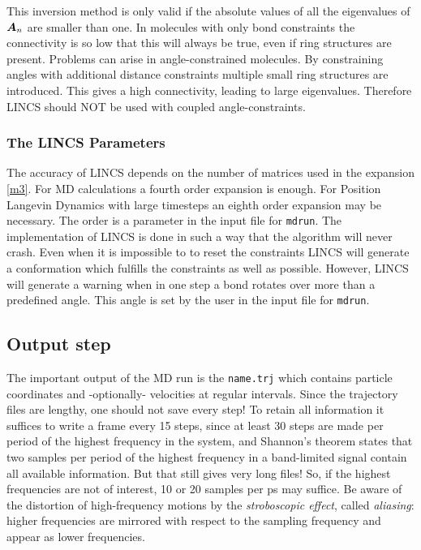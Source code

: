 This inversion method is only valid if the absolute values of all the
eigenvalues of $\mbox{\boldmath ${A}$}_n$ are smaller than one.
In molecules with only bond constraints the connectivity is so low
that this will always be true, even if ring structures are present.
Problems can arise in angle-constrained molecules.
By constraining angles with additional distance constraints
multiple small ring structures are introduced.
This gives a high connectivity, leading to large eigenvalues.
Therefore LINCS should NOT be used with coupled angle-constraints.

\subsubsection*{The LINCS Parameters}
The accuracy of LINCS depends on the number of matrices used
in the expansion \ref{m3}. For MD calculations a fourth order
expansion is enough. For Position Langevin Dynamics with
large timesteps an eighth order expansion may be necessary.
The order is a parameter in the input file for \verb'mdrun'.
The implementation of LINCS is done in such a way that the 
algorithm will never crash. Even when it is impossible to
to reset the constraints LINCS will generate a conformation
which fulfills the constraints as well as possible.
However, LINCS will generate a warning when in one step a bond 
rotates over more than a predefined angle.
This angle is set by the user in the input file for \verb'mdrun'.


\subsection{Output step}
The important output of the MD run is the {\em
{}} \verb'name.trj' which contains particle coordinates
and -optionally- velocities at regular intervals. Since the trajectory
files are lengthy, one should not save every step! To retain all
information it suffices to write a frame every 15 steps, since at
least 30 steps are made per period of the highest frequency in the
system, and Shannon's  theorem states that two samples per
period of the highest frequency in a band-limited signal contain all
available information. But that still gives very long files! So, if
the highest frequencies are not of interest, 10 or 20 samples per ps
may suffice. Be aware of the distortion of high-frequency motions by
the {\em stroboscopic effect}, called {\em aliasing}: higher frequencies
are  mirrored with respect to the sampling frequency and appear as
lower frequencies. 

